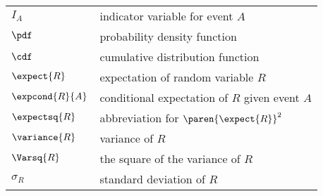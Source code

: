 \begin{center}
\begin{tabular}{ll}
$I_A$          & indicator variable for event $A$\\
$\pdf$         & probability density function\\
$\cdf$         & cumulative distribution function\\
$\expect{R}$   & expectation of random variable $R$\\
$\expcond{R}{A}$ & conditional expectation of $R$ given event $A$\\
$\expectsq{R}$   & abbreviation for $\paren{\expect{R}}^2$\\
$\variance{R}$ & variance of $R$\\
$\Varsq{R}$     & the square of the variance of $R$\\
$\sigma_R$     & standard deviation of $R$
\end{tabular}
\end{center}

\endinput
